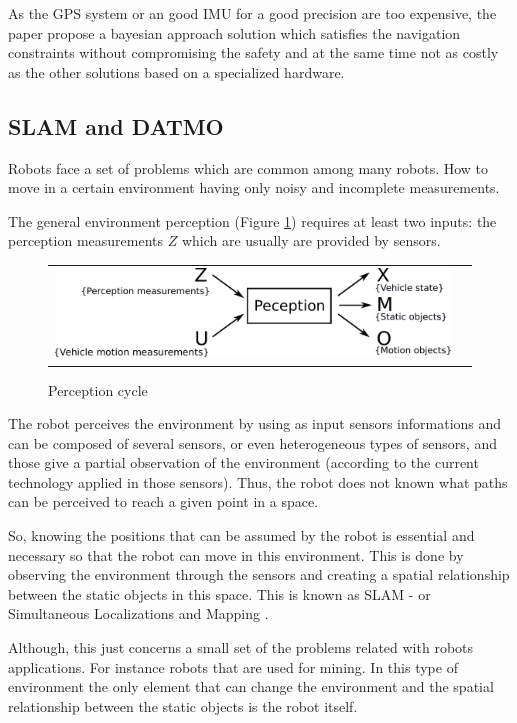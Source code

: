 As the GPS system or an good IMU for a good precision are too expensive, the paper propose a bayesian approach solution which satisfies the navigation constraints without compromising the safety and at the same time not as costly as the other solutions based on a specialized hardware.

\subsection{SLAM and DATMO}

Robots face a set of problems which are common among many robots. How to move in a certain environment having only noisy and incomplete measurements.

The general environment perception (Figure \ref{fig:perception:cycle}) requires at least two inputs: the perception measurements $Z$ which are usually are provided by sensors.

\begin{figure}[h]
   \centering
     \begin{tabular}{lr}
       \includegraphics[scale=0.5]{img/fig:perception:cycle}
     \end{tabular}
   \caption{Perception cycle}
   \label{fig:perception:cycle}
 \end{figure}


The robot perceives the environment by using as input sensors informations and can be composed of several sensors, or even heterogeneous types of sensors, and those give a partial observation of the environment (according to the current technology applied in those sensors). Thus, the robot does not known what paths can be perceived to reach a given point in a space.

So, knowing the positions that can be assumed by the robot is essential and necessary so that the robot can move in this environment. This is done by observing the environment through the sensors and creating a spatial relationship between the static objects in this space. This is known as SLAM - or Simultaneous Localizations and Mapping \cite{iyengar1991autonomous}.

Although, this just concerns a small set of the problems related with robots applications. For instance robots that are used for mining. In this type of environment the only element that can change the environment and the spatial relationship between the static objects is the robot itself. 

